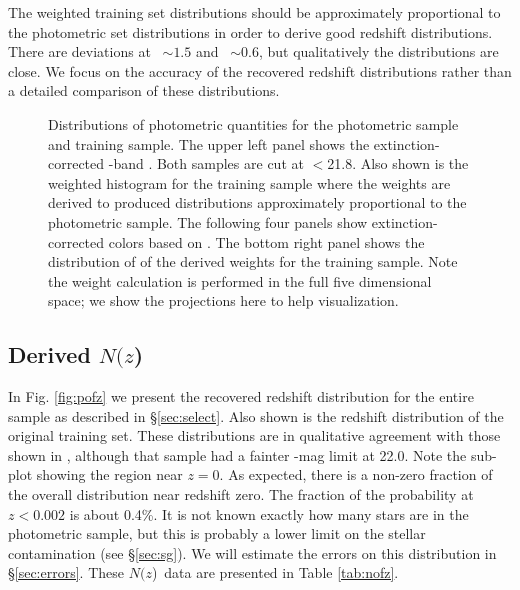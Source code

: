 \documentclass[12pt,preprint]{aastex}
\newcommand{\rmax}{21.8}
\newcommand{\nofz}{$N(z$)}
\begin{document}
The weighted training set distributions should be approximately proportional to
the photometric set distributions in order to derive good redshift
distributions.  There are deviations at \gmr\ $\sim 1.5$ and \rmi\ $\sim 0.6$,
but qualitatively the distributions are close.  We focus on the accuracy of the
recovered redshift distributions rather than a detailed comparison of these
distributions.

\begin{figure}[p] \centering

    \caption{Distributions of photometric quantities for the photometric sample
    and training sample.  The upper left panel shows the extinction-corrected
    \rmag-band \cmodelmag.  Both samples are cut at \rmag$ < $\rmax.  Also
    shown is the weighted histogram for the training sample where the weights
    are derived to produced distributions approximately proportional to the
    photometric sample.  The following four panels show extinction-corrected
    colors based on \modelmag.  The bottom right panel shows the distribution
    of of the derived weights for the training sample. Note the weight
    calculation is performed in the full five dimensional space; we show
    the projections here to help visualization.} \label{fig:varhist}

    \vspace{2em}
\end{figure}

\subsection{Derived \nofz}

In Fig. \ref{fig:pofz} we present the recovered redshift distribution for the
entire sample as described in \S \ref{sec:select}.  Also shown is the redshift
distribution of the original training set.  These distributions are in
qualitative agreement with those shown in \citet{CunhaPhotoz09}, although that
sample had a fainter \rmag-mag limit at 22.0.  Note the sub-plot showing the
region near $z=0$.  As expected, there is a non-zero fraction of the overall
distribution near redshift zero.  The fraction of the probability at $z <
0.002$ is about 0.4\%.  It is not known exactly how many stars are in the
photometric sample, but this is probably a lower limit on the stellar
contamination (see \S \ref{sec:sg}).  We will estimate the errors on this
distribution in \S \ref{sec:errors}. These \nofz\ data are presented in Table
\ref{tab:nofz}.
\end{document}
